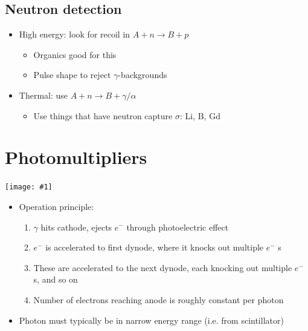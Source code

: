 \documentclass[11pt]{article}
\newcommand{\el}{\ensuremath{e^{-}}\xspace}
\newcommand{\embedimgw}[2]{\begin{center}\texttt{[image: \#1]}\end{center}}
\begin{document}
\subsection{Neutron detection}
\begin{itemize}
  \item High energy: look for recoil in $A+n\rightarrow B+p$
  \begin{itemize}
    \item Organics good for this
    \item Pulse shape to reject $\gamma$-backgrounds
  \end{itemize}
  \item Thermal: use $A+n\rightarrow B+\gamma/\alpha$
  \begin{itemize}
    \item Use things that have neutron capture $\sigma$: Li, B, Gd
  \end{itemize}
\end{itemize}

\section{Photomultipliers}
\embedimgw{figs/pmt.png}{.6}
\begin{itemize}
  \item Operation principle:
  \begin{enumerate}
    \item $\gamma$ hits cathode, ejects \el through photoelectric effect
    \item \el is accelerated to first dynode, where it knocks out multiple \el s
    \item These are accelerated to the next dynode, each knocking out multiple \el s, and so on
    \item Number of electrons reaching anode is roughly constant per photon
  \end{enumerate}
  \item Photon must typically be in narrow energy range (i.e. from scintillator)
\end{itemize}
\end{document}

